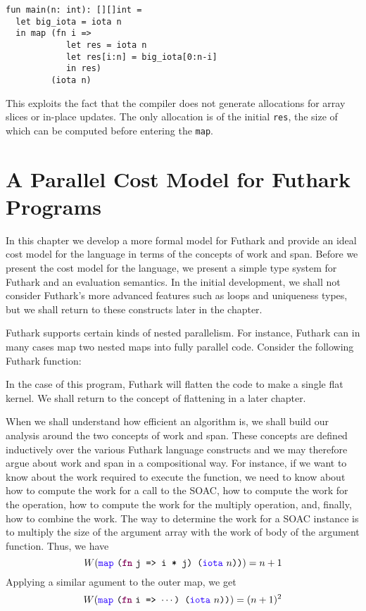 \documentclass[11pt]{book}
\begin{document}
\begin{lstlisting}
fun main(n: int): [][]int =
  let big_iota = iota n
  in map (fn i =>
            let res = iota n
            let res[i:n] = big_iota[0:n-i]
            in res)
         (iota n)
\end{lstlisting}

This exploits the fact that the compiler does not generate allocations
for array slices or in-place updates.  The only allocation is of the
initial \texttt{res}, the size of which can be computed before
entering the \texttt{map}.

\chapter{A Parallel Cost Model for Futhark Programs}
\label{chap:costmodel}
In this chapter we develop a more formal model for Futhark and provide
an ideal cost model for the language in terms of the concepts of work
and span. Before we present the cost model for the language, we
present a simple type system for Futhark and an evaluation
semantics. In the initial development, we shall not consider Futhark's
more advanced features such as loops and uniqueness types, but we
shall return to these constructs later in the chapter.

Futhark supports certain kinds of nested parallelism. For instance,
Futhark can in many cases map two nested maps into fully parallel
code. Consider the following Futhark function:


\noindent
In the case of this program, Futhark will flatten the code to make a
single flat kernel. We shall return to the concept of flattening in a
later chapter.

When we shall understand how efficient an algorithm is, we shall build
our analysis around the two concepts of work and span. These concepts
are defined inductively over the various Futhark language constructs
and we may therefore argue about work and span in a compositional
way. For instance, if we want to know about the work required to
execute the  function, we need to know about how to
compute the work for a call to the  SOAC, how to compute the
work for the  operation, how to compute the work for the
multiply operation, and, finally, how to combine the work. The way to
determine the work for a  SOAC instance is to multiply the
size of the argument array with the work of body of the argument
function. Thus, we have
$$ W(\fop{map}~\kw{(}\fw{fn}~\kw{j => i * j) (}\fop{iota}~\kw{$n$))}) = n+1 $$
Applying a similar agument to the outer map, we get
$$W(\fop{map}~\kw{(}\fw{fn}~\kw{i => $\cdots$) (}\fop{iota}~\kw{$n$))}) = (n+1)^2 $$
\end{document}
